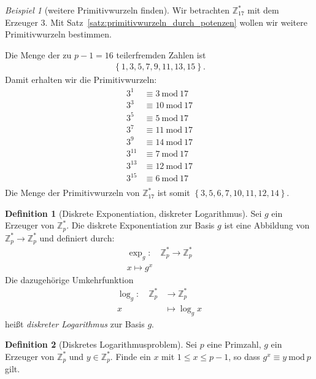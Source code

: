 \documentclass[
  a4paper,
  11pt,
]{scrartcl}
\theoremstyle{plain}
\theoremstyle{definition}
\newtheorem{definition}{Definition}
\theoremstyle{remark}
\newtheorem{beispiel}{Beispiel}
\newcommand{\Z}{\mathbb{Z}}
\newcommand{\Mod}[1]{\ \mathrm{mod}\ #1}
\begin{document}
\begin{beispiel}[weitere Primitivwurzeln finden]
  Wir betrachten $\Z_{17}^*$ mit dem Erzeuger $3$. Mit
  Satz~\ref{satz:primitivwurzeln_durch_potenzen} wollen wir weitere
  Primitivwurzeln bestimmen.

  Die Menge der zu $p-1 = 16$ teilerfremden Zahlen ist
  \begin{align*}
    \left\{1, 3, 5, 7, 9, 11, 13, 15 \right\}.
  \end{align*}
  Damit erhalten wir die Primitivwurzeln:
  \begin{align*}
    3^1 & \equiv 3 \Mod{17}\\
    3^3 & \equiv 10 \Mod{17}\\
    3^5 & \equiv 5 \Mod{17}\\
    3^7 & \equiv 11 \Mod{17}\\
    3^9 & \equiv 14 \Mod{17}\\
    3^{11} & \equiv 7 \Mod{17}\\
    3^{13} & \equiv 12 \Mod{17}\\
    3^{15} & \equiv 6 \Mod{17}\\
  \end{align*}
  Die Menge der Primitivwurzeln von $\Z_{17}^*$ ist somit
  $\left\{ 3, 5, 6, 7, 10, 11, 12, 14 \right\}$.
\end{beispiel}

\begin{definition}[Diskrete Exponentiation, diskreter Logarithmus]
  Sei $g$ ein Erzeuger von $\Z_p^*$. Die diskrete Exponentiation zur Basis $g$
  ist eine Abbildung von $\Z_p^* \to \Z_p^*$ und definiert durch:
  \begin{align*}
    \exp_g: \quad \Z_p^* \to \Z_p^*\\
    x \mapsto g^x
  \end{align*}
  Die dazugehörige Umkehrfunktion
  \begin{align*}
    \log_g: \quad \Z_p^* & \to \Z_p^*\\
    x & \mapsto \log_g x
  \end{align*}
  heißt \emph{diskreter Logarithmus} zur Basis $g$.
\end{definition}

\begin{definition}[Diskretes Logarithmusproblem]\label{def:diskretes_logarithmusproblem}
  Sei $p$ eine Primzahl, $g$ ein Erzeuger von $\Z_p^*$ und $y \in \Z_p^*$.
  Finde ein $x$ mit $1 \leq x \leq p-1$, so dass $g^x \equiv y \Mod{p}$ gilt.
\end{definition}
\end{document}
